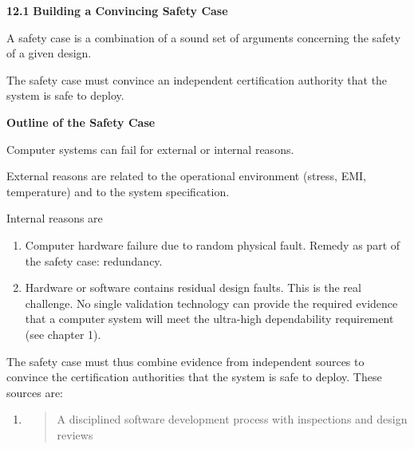 \textbf{12.1} \protect\hypertarget{teil2}{}{}\textbf{Building a
Convincing Safety Case}

A safety case is a combination of a sound set of arguments concerning
the safety of a given design.

The safety case must convince an independent certification authority
that the system is safe to deploy.

\textbf{Outline of the Safety Case}

Computer systems can fail for external or internal reasons.

External reasons are related to the operational environment (stress,
EMI, temperature) and to the system specification.

Internal reasons are

\begin{enumerate}
\def\labelenumi{\arabic{enumi}.}
\item
  Computer hardware failure due to random physical fault. Remedy as part
  of the safety case: redundancy.
\item
  Hardware or software contains residual design faults. This is the real
  challenge. No single validation technology can provide the required
  evidence that a computer system will meet the ultra-high dependability
  requirement (see chapter 1).
\end{enumerate}

The safety case must thus combine evidence from independent sources to
convince the certification authorities that the system is safe to
deploy. These sources are:

\begin{enumerate}
\def\labelenumi{\arabic{enumi}.}
\item
  \begin{quote}
  A disciplined software development process with inspections and design
  reviews
  \end{quote}
\end{enumerate}

\textbf{\\
}

